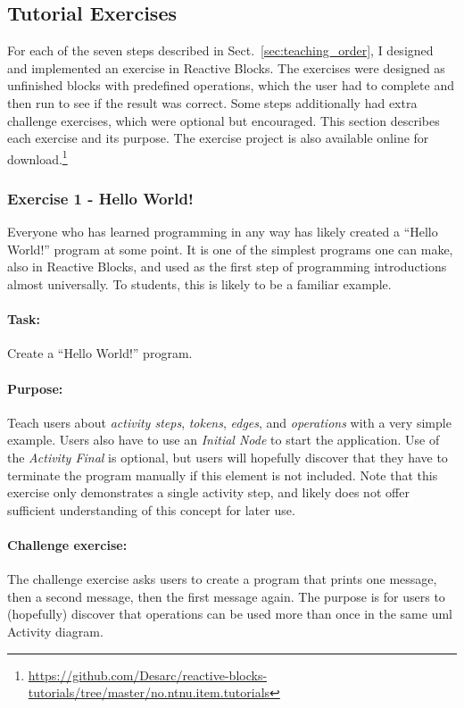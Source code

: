 \subsection{Tutorial Exercises}
\label{sec:tutorial_exercises}
For each of the seven steps described in Sect.~\ref{sec:teaching_order}, I designed and implemented an exercise in Reactive Blocks. The exercises were designed as unfinished blocks with predefined operations, which the user had to complete and then run to see if the result was correct. Some steps additionally had extra challenge exercises, which were optional but encouraged. This section describes each exercise and its purpose. The exercise project is also available online for download.\footnote{\url{https://github.com/Desarc/reactive-blocks-tutorials/tree/master/no.ntnu.item.tutorials}}

\subsubsection{Exercise 1 - Hello World!}
Everyone who has learned programming in any way has likely created a ``Hello World!'' program at some point. It is one of the simplest programs one can make, also in Reactive Blocks, and used as the first step of programming introductions almost universally. To students, this is likely to be a familiar example.

\paragraph{Task:} Create a ``Hello World!'' program.

\paragraph{Purpose:} Teach users about \emph{activity steps}, \emph{tokens}, \emph{edges}, and \emph{operations} with a very simple example. Users also have to use an \emph{Initial Node} to start the application. Use of the \emph{Activity Final} is optional, but users will hopefully discover that they have to terminate the program manually if this element is not included. Note that this exercise only demonstrates a single activity step, and likely does not offer sufficient understanding of this concept for later use.

\paragraph{Challenge exercise:} The challenge exercise asks users to create a program that prints one message, then a second message, then the first message again. The purpose is for users to (hopefully) discover that operations can be used more than once in the same \gls{uml} Activity diagram.


